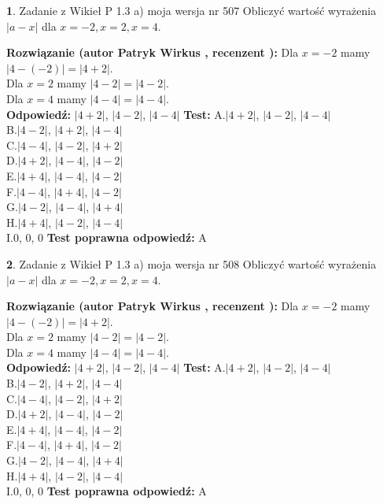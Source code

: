 \documentclass[12pt, a4paper]{article}
\theoremstyle{definition} %
\newtheorem{zad}{}
\newcommand{\zadStart}[1]{\begin{zad}#1\newline}
\newcommand{\zadStop}{\end{zad}}
\newcommand{\rozwStart}[2]{\noindent \textbf{Rozwiązanie (autor #1 , recenzent #2): }\newline}
\newcommand{\rozwStop}{\newline}
\newcommand{\odpStart}{\noindent \textbf{Odpowiedź:}\newline}
\newcommand{\odpStop}{\newline}
\newcommand{\testStart}{\noindent \textbf{Test:}\newline}
\newcommand{\testStop}{\newline}
\newcommand{\kluczStart}{\noindent \textbf{Test poprawna odpowiedź:}\newline}
\newcommand{\kluczStop}{\newline}
\begin{document}
\zadStart{Zadanie z Wikieł P 1.3 a) moja wersja nr 507}
Obliczyć wartość wyrażenia $|a - x|$ dla $x=-2,x=2,x=4$.
\zadStop
\rozwStart{Patryk Wirkus}{}
Dla $x = -2$ mamy $|4 - (-2)| = |4 + 2|$.\\
Dla $x = 2$ mamy $|4 - 2| = |4 - 2|$.\\
Dla $x = 4$ mamy $|4 - 4| = |4 - 4|$.\\
\rozwStop
\odpStart
$|4 + 2|$, $|4 - 2|$, $|4 - 4|$
\odpStop
\testStart
A.$|4 + 2|$, $|4 - 2|$, $|4 - 4|$\\
B.$|4 - 2|$, $|4 + 2|$, $|4 - 4|$\\
C.$|4 - 4|$, $|4 - 2|$, $|4 + 2|$\\
D.$|4 + 2|$, $|4 - 4|$, $|4 - 2|$\\
E.$|4 + 4|$, $|4 - 4|$, $|4 - 2|$\\
F.$|4 - 4|$, $|4 + 4|$, $|4 - 2|$\\
G.$|4 - 2|$, $|4 - 4|$, $|4 + 4|$\\
H.$|4 + 4|$, $|4 - 2|$, $|4 - 4|$\\
I.$0$, $0$, $0$
\testStop
\kluczStart
A
\kluczStop



\zadStart{Zadanie z Wikieł P 1.3 a) moja wersja nr 508}
Obliczyć wartość wyrażenia $|a - x|$ dla $x=-2,x=2,x=4$.
\zadStop
\rozwStart{Patryk Wirkus}{}
Dla $x = -2$ mamy $|4 - (-2)| = |4 + 2|$.\\
Dla $x = 2$ mamy $|4 - 2| = |4 - 2|$.\\
Dla $x = 4$ mamy $|4 - 4| = |4 - 4|$.\\
\rozwStop
\odpStart
$|4 + 2|$, $|4 - 2|$, $|4 - 4|$
\odpStop
\testStart
A.$|4 + 2|$, $|4 - 2|$, $|4 - 4|$\\
B.$|4 - 2|$, $|4 + 2|$, $|4 - 4|$\\
C.$|4 - 4|$, $|4 - 2|$, $|4 + 2|$\\
D.$|4 + 2|$, $|4 - 4|$, $|4 - 2|$\\
E.$|4 + 4|$, $|4 - 4|$, $|4 - 2|$\\
F.$|4 - 4|$, $|4 + 4|$, $|4 - 2|$\\
G.$|4 - 2|$, $|4 - 4|$, $|4 + 4|$\\
H.$|4 + 4|$, $|4 - 2|$, $|4 - 4|$\\
I.$0$, $0$, $0$
\testStop
\kluczStart
A
\kluczStop
\end{document}
